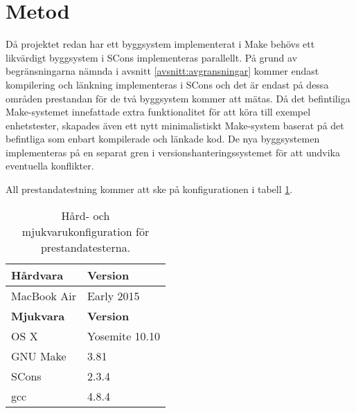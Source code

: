 \section{Metod}
Då projektet redan har ett byggsystem implementerat i Make behövs ett likvärdigt byggsystem i SCons implementeras parallellt. På grund av begränsningarna nämnda i avsnitt \ref{avsnitt:avgransningar} kommer endast kompilering och länkning implementeras i SCons och det är endast på dessa områden prestandan för de två byggsystem kommer att mätas. Då det befintiliga Make-systemet innefattade extra funktionalitet för att köra till exempel enhetstester, skapades även ett nytt minimalistiskt Make-system baserat på det befintliga som enbart kompilerade och länkade kod. De nya byggsystemen implementeras på en separat gren i versionshanteringssystemet för att undvika eventuella konflikter.

All prestandatestning kommer att ske på konfigurationen i tabell \ref{tabell:konfig}.

\begin{table}[h!]
  \centering
  \begin{tabular}{|l|l|}
    \hline
    \textbf{Hårdvara} & \textbf{Version} \\ \hline
    MacBook Air & Early 2015 \\ \hline
    \textbf{Mjukvara} & \textbf{Version} \\ \hline
    OS X & Yosemite 10.10 \\ \hline
    GNU Make & 3.81 \\ \hline
    SCons & 2.3.4 \\ \hline
    gcc & 4.8.4 \\ \hline
  \end{tabular}
  \caption{Hård- och mjukvarukonfiguration för prestandatesterna.}
  \label{tabell:konfig}
\end{table}
